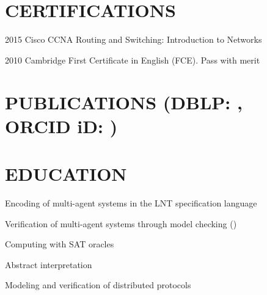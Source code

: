 \documentclass[a4paper]{deedy-resume-openfont}
\begin{document}
\begin{minipage}[t]{0.3\textwidth}
\section{CERTIFICATIONS} 
\vspace{\topsep} %
\begin{tightemize}
\item[2015]    Cisco CCNA Routing and Switching: Introduction to Networks\\
\item[2010]    Cambridge First Certificate in English (FCE). Pass with merit\\
\end{tightemize}
\sectionsep%

\end{minipage} 
\hfill
\begin{minipage}[t]{0.67\textwidth} 

\section[Publications]{PUBLICATIONS \small{(DBLP\@: \href{https://dblp.org/pid/215/9758}{}, ORCID iD\@: \href{https://orcid.org/0000-0003-1922-3151}{})}}
\vspace{\topsep} %

\nocite{*}

\sectionsep%


\section{EDUCATION}

\begin{tightemize}
    \item Encoding of multi-agent systems in the LNT specification language
    \item Verification of multi-agent systems through model checking (\href{https://cadp.inria.fr/}{})
\end{tightemize}
\sectionsep%

\begin{tightemize}
    \item Computing with SAT oracles
    \item Abstract interpretation
    \item Modeling and verification of distributed protocols
\end{tightemize}
\sectionsep%


\end{minipage}
\end{document}
